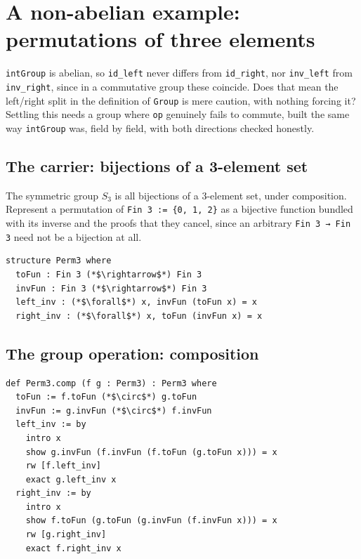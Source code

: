 \section{A non-abelian example: permutations of three elements}\label{sec:07-groups:04-permutations-example:1}

\texttt{intGroup} is abelian, so \texttt{id\_\allowbreak{}left} never differs from \texttt{id\_\allowbreak{}right}, nor \texttt{inv\_\allowbreak{}left} from \texttt{inv\_\allowbreak{}right}, since in a commutative group these coincide. Does that mean the left/right split in the definition of \texttt{Group} is mere caution, with nothing forcing it? Settling this needs a group where \texttt{op} genuinely fails to commute, built the same way \texttt{intGroup} was, field by field, with both directions checked honestly.

\subsection{The carrier: bijections of a 3-element set}\label{sec:07-groups:04-permutations-example:2}

The symmetric group \(S_3\) is all bijections of a 3-element set, under composition. Represent a permutation of \texttt{Fin 3 := \{0, 1, 2\}} as a bijective function bundled with its inverse and the proofs that they cancel, since an arbitrary \texttt{Fin 3 → Fin 3} need not be a bijection at all.

\begin{lstlisting}
structure Perm3 where
  toFun : Fin 3 (*$\rightarrow$*) Fin 3
  invFun : Fin 3 (*$\rightarrow$*) Fin 3
  left_inv : (*$\forall$*) x, invFun (toFun x) = x
  right_inv : (*$\forall$*) x, toFun (invFun x) = x
\end{lstlisting}

\subsection{The group operation: composition}\label{sec:07-groups:04-permutations-example:3}

\begin{lstlisting}
def Perm3.comp (f g : Perm3) : Perm3 where
  toFun := f.toFun (*$\circ$*) g.toFun
  invFun := g.invFun (*$\circ$*) f.invFun
  left_inv := by
    intro x
    show g.invFun (f.invFun (f.toFun (g.toFun x))) = x
    rw [f.left_inv]
    exact g.left_inv x
  right_inv := by
    intro x
    show f.toFun (g.toFun (g.invFun (f.invFun x))) = x
    rw [g.right_inv]
    exact f.right_inv x
\end{lstlisting}

